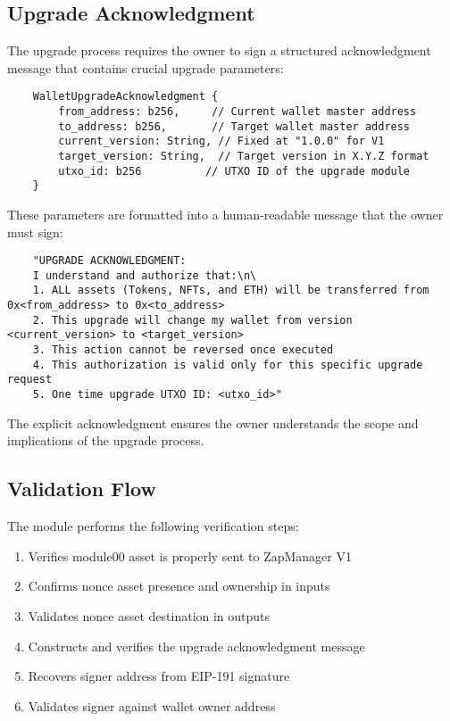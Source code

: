 \subsection{Upgrade Acknowledgment}
The upgrade process requires the owner to sign a structured acknowledgment message that contains crucial upgrade parameters:

\begin{lstlisting}
    WalletUpgradeAcknowledgment {
        from_address: b256,     // Current wallet master address
        to_address: b256,       // Target wallet master address
        current_version: String, // Fixed at "1.0.0" for V1
        target_version: String,  // Target version in X.Y.Z format
        utxo_id: b256          // UTXO ID of the upgrade module
    }
\end{lstlisting}

These parameters are formatted into a human-readable message that the owner must sign:

\begin{lstlisting}
    "UPGRADE ACKNOWLEDGMENT:
    I understand and authorize that:\n\
    1. ALL assets (Tokens, NFTs, and ETH) will be transferred from 0x<from_address> to 0x<to_address>
    2. This upgrade will change my wallet from version <current_version> to <target_version>
    3. This action cannot be reversed once executed
    4. This authorization is valid only for this specific upgrade request
    5. One time upgrade UTXO ID: <utxo_id>"
\end{lstlisting}

The explicit acknowledgment ensures the owner understands the scope and implications of the upgrade process.



\subsection{Validation Flow}
The module performs the following verification steps:
\begin{enumerate}
    \item Verifies module00 asset is properly sent to ZapManager V1
    \item Confirms nonce asset presence and ownership in inputs
    \item Validates nonce asset destination in outputs
    \item Constructs and verifies the upgrade acknowledgment message
    \item Recovers signer address from EIP-191 signature
    \item Validates signer against wallet owner address
\end{enumerate}

